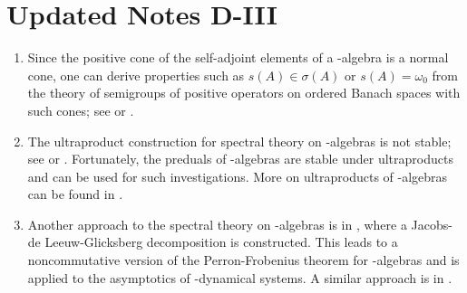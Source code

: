 \section{Updated Notes D-III}
\begin{enumerate}
\item 
Since the positive cone of the self-adjoint elements of a \CA-algebra is a normal cone, one can derive properties such as $s(A) \in \sigma(A)$ or $s(A) = \omega_{0}$ from the theory of semigroups of positive operators on ordered Banach spaces with such cones; see  or .

\item 
The ultraproduct construction for spectral theory on \WA-algebras is not stable; see  or .
Fortunately, the preduals of \WA-algebras are stable under ultraproducts and can be used for such investigations.
More on ultraproducts of \WA-algebras can be found in .

\item 
Another approach to the spectral theory on \WA-algebras is in , where a Jacobs-de Leeuw-Glicksberg decomposition is constructed.
This leads to a noncommutative version of the Perron-Frobenius theorem for \WA-algebras and is applied to the asymptotics of \WA-dynamical systems.
A similar approach is in .

\end{enumerate}